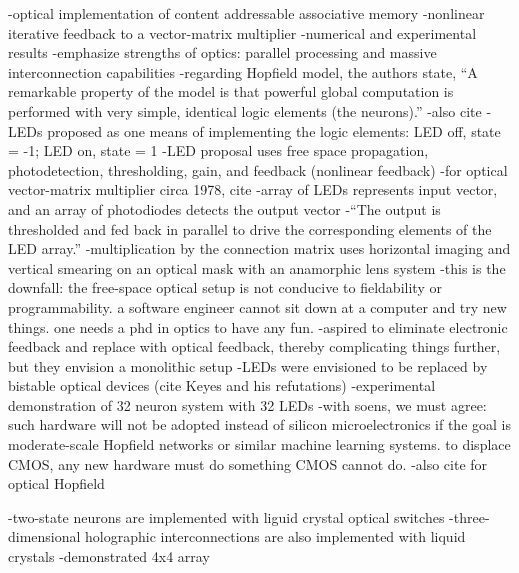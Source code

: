 \cite{faps1985}
-optical implementation of content addressable associative memory
-nonlinear iterative feedback to a vector-matrix multiplier
-numerical and experimental results
-emphasize strengths of optics: parallel processing and massive interconnection capabilities
-regarding Hopfield model, the authors state, ``A remarkable property of the model is that powerful global computation is performed with very simple, identical logic elements (the neurons).''
-also cite \cite{psfa1985}
-LEDs proposed as one means of implementing the logic elements: LED off, state = -1; LED on, state = 1
-LED proposal uses free space propagation, photodetection, thresholding, gain, and feedback (nonlinear feedback)
-for optical vector-matrix multiplier circa 1978, cite \cite{godi1978}
-array of LEDs represents input vector, and an array of photodiodes detects the output vector
-``The output is thresholded and fed back in parallel to drive the corresponding elements of the LED array.''
-multiplication by the connection matrix uses horizontal imaging and vertical smearing on an optical mask with an anamorphic lens system
-this is the downfall: the free-space optical setup is not conducive to fieldability or programmability. a software engineer cannot sit down at a computer and try new things. one needs a phd in optics to have any fun.
-aspired to eliminate electronic feedback and replace with optical feedback, thereby complicating things further, but they envision a monolithic setup
-LEDs were envisioned to be replaced by bistable optical devices (cite Keyes and his refutations)
-experimental demonstration of 32 neuron system with 32 LEDs
-with soens, we must agree: such hardware will not be adopted instead of silicon microelectronics if the goal is moderate-scale Hopfield networks or similar machine learning systems. to displace CMOS, any new hardware must do something CMOS cannot do.
-also cite \cite{jaju1988} for optical Hopfield

\cite{jaju1988,}
-two-state neurons are implemented with liguid crystal optical switches
-three-dimensional holographic interconnections are also implemented with liquid crystals
-demonstrated 4x4 array


